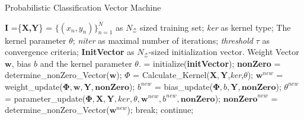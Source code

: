 \begin{algorithm}[H]
	\caption{Probabilistic Classification Vector Machine}\label{PseudoCodePcvm}	
	\begin{algorithmic}[1]
		\Require $\mathbf{I}$ =\{\textbf{X,Y}\} = $\{(x_n,y_n)\}_{n=1}^{N}$ as $N_\mathcal{Z}$ sized training set;
		\textit{ker} as kernel type; The kernel parameter $\theta$; \textit{niter} as maximal number of iterations; \textit{threshold} $\tau$ as convergence criteria; \textbf{InitVector} as $N_\mathcal{Z}$-sized initialization vector.
		\Ensure Weight Vector $\mathbf{w}$, bias $b$ and the kernel parameter $\theta$.
		\State	[$\mathbf{w},b$] = initialize(\textbf{initVector});
		\State \textbf{nonZero} = determine\_nonZero\_Vector($\mathbf{w}$); 
		\State $\Phi$ = Calculate\_Kernel($\mathbf{X,Y}$,\textit{ker},$\theta$); 
		\State $\mathbf{w}^{new}$ = weight\_update($\mathbf{\Phi,w,Y,nonZero}$);  
		\State $b^{new}$ = bias\_update($\mathbf{\Phi},b,\mathbf{Y,nonZero}$);
		\State $\theta^{new}$ = parameter\_update($\mathbf{\Phi,X,Y},\mathit{ker},\theta,\mathbf{w}^{new},b^{new},\mathbf{nonZero}$);
		\State $\mathbf{nonZero}^{new}$ = determine\_nonZero\_Vector($\mathbf{w}^{new}$);
		\State break;
		\Else
		\State continue;
		\EndIf
		\EndFor
	\end{algorithmic}
\end{algorithm}
\\
